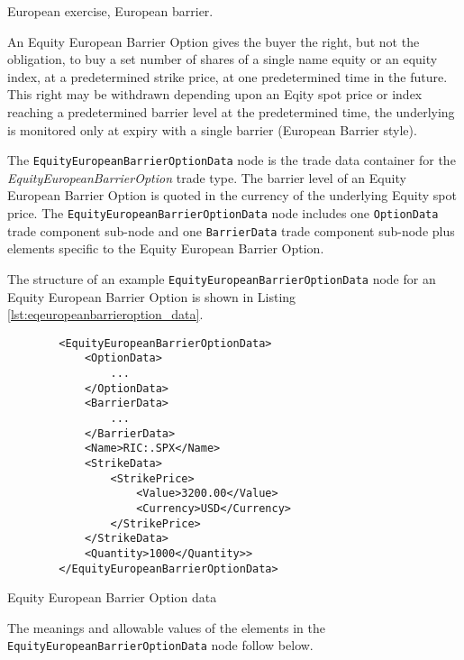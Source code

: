 \else

European exercise, European barrier.

An Equity European Barrier Option gives the buyer the right, but not the obligation, to buy 
a set number of shares of a single name equity or an equity index, at a 
predetermined strike price, at one predetermined time in the future. This right may be withdrawn depending upon
an Eqity spot price or index reaching a predetermined barrier level at the predetermined time, the
underlying is monitored only at expiry with a single barrier (European Barrier style).

\fi

The \lstinline!EquityEuropeanBarrierOptionData!  node is the trade data container for the \emph{EquityEuropeanBarrierOption} trade type. The barrier level of an Equity European Barrier Option is quoted in the currency of the 
underlying Equity spot price. The \lstinline!EquityEuropeanBarrierOptionData!  node includes one  \lstinline!OptionData! trade component sub-node and one \lstinline!BarrierData! trade component sub-node plus elements
specific to the Equity European Barrier Option. 

The structure of an example \lstinline!EquityEuropeanBarrierOptionData! node for an Equity European Barrier Option is shown in Listing
\ref{lst:eqeuropeanbarrieroption_data}.

\begin{listing}[H]
\begin{verbatim}
        <EquityEuropeanBarrierOptionData>
            <OptionData>
                ...
            </OptionData>
            <BarrierData>
                ...
            </BarrierData>
            <Name>RIC:.SPX</Name>
            <StrikeData>
                <StrikePrice>
					<Value>3200.00</Value>
					<Currency>USD</Currency>
				</StrikePrice>
            </StrikeData>
            <Quantity>1000</Quantity>>
        </EquityEuropeanBarrierOptionData>
\end{verbatim}
\caption{Equity European Barrier Option data}
\label{lst:eqeuropeanbarrieroption_data}
\end{listing}

The meanings and allowable values of the elements in the \lstinline!EquityEuropeanBarrierOptionData!  node follow below.


